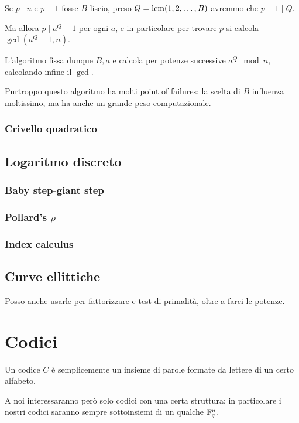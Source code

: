 \documentclass[a4paper]{book}
\begin{document}
    Se $p\mid n$ e $p-1$ fosse $B$-liscio, preso $Q=\operatorname{lcm}(1,2,\dots,B)$ avremmo che $p-1\mid Q$.

    Ma allora $p\mid a^Q-1$ per ogni $a$, e in particolare per trovare $p$ si calcola $\gcd(a^Q-1,n)$.

    L'algoritmo fissa dunque $B,a$ e calcola per potenze successive $a^Q\mod n$, calcolando infine il $\gcd$.

    Purtroppo questo algoritmo ha molti point of failures: la scelta di $B$ influenza moltissimo, ma ha anche un grande peso computazionale.

    \subsection{Crivello quadratico}


    \section{Logaritmo discreto}

    \subsection{Baby step-giant step}

    \subsection{Pollard's $\rho$}

    \subsection{Index calculus}

    \section{Curve ellittiche}

    Posso anche usarle per fattorizzare e test di primalità, oltre a farci le potenze.


    \chapter{Codici}
    Un codice $C$ è semplicemente un insieme di parole formate da lettere di un certo alfabeto.

    A noi interessaranno però solo codici con una certa struttura; in particolare i nostri codici saranno sempre sottoinsiemi di un qualche $\mathbb{F}_q^n$.
\end{document}
